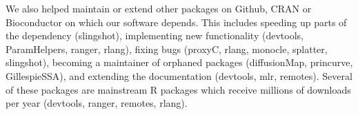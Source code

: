 We also helped maintain or extend other packages on Github, CRAN or Bioconductor on which our software depends. This includes speeding up parts of the dependency (slingshot), implementing new functionality (devtools, ParamHelpers, ranger, rlang), fixing bugs (proxyC, rlang, monocle, splatter, slingshot), becoming a maintainer of orphaned packages (diffusionMap, princurve, GillespieSSA), and extending the documentation (devtools, mlr, remotes). Several of these packages are mainstream R packages which receive millions of downloads per year (devtools, ranger, remotes, rlang).

\newcommand{\cranpkg}[1]{\href{https://cran.r-project.org/package=#1}{#1}}
\newcommand{\biocpkg}[1]{\href{https://bioconductor.org/packages/#1}{#1}}
\newcommand{\biocpkgl}[2]{\href{https://bioconductor.org/packages/#1}{#2}}
\newcommand{\githubpkg}[2]{\href{https://github.com/#1/#2}{#2}}
\newcommand{\notavailable}{}

